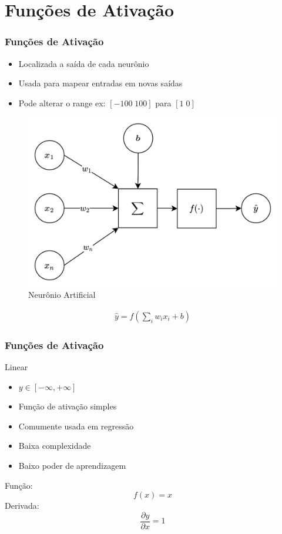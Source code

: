\documentclass{beamer}
\begin{document}
\section{Funções de Ativação}
\begin{frame}
	\frametitle{Funções de Ativação}
	\begin{itemize}
		\item Localizada a saída de cada neurônio
		\item Usada para mapear entradas em novas saídas
		\item Pode alterar o range ex: $[-100 \; 100]$ para $[1 \; 0]$
	\end{itemize}
	\begin{figure}
		\centering
		\includegraphics[width=0.4\linewidth]{figures/neuron_ai}
		\caption{Neurônio Artificial}
	\end{figure}
	
	\begin{gather*}
		\hat{y} = f( \sum_i w_i x_i + b)
	\end{gather*}
\end{frame}

\begin{frame}
	\frametitle{Funções de Ativação}
	\begin{block}{Linear}
		\begin{itemize}
			\item $y \in [- \infty, + \infty]$
			\item Função de ativação simples
			\item Comumente usada em regressão
			\item Baixa complexidade
			\item Baixo poder de aprendizagem
		\end{itemize}
	Função:
			$$f(x) = x$$
	Derivada: 	$$\frac{\partial y}{\partial x} = 1$$
	
	\end{block}
\end{frame}
\end{document}
